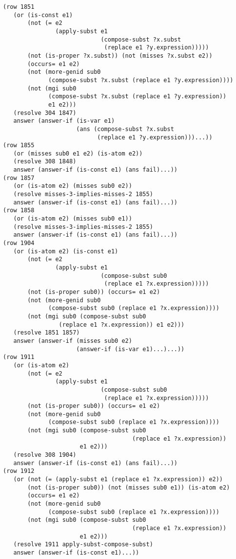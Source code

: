 \documentclass[runningheads]{llncs}
\begin{document}
\begin{verbatim}
(row 1851
   (or (is-const e1)
       (not (= e2
               (apply-subst e1
                            (compose-subst ?x.subst
                             (replace e1 ?y.expression)))))
       (not (is-proper ?x.subst)) (not (misses ?x.subst e2))
       (occurs= e1 e2)
       (not (more-genid sub0
             (compose-subst ?x.subst (replace e1 ?y.expression))))
       (not (mgi sub0
             (compose-subst ?x.subst (replace e1 ?y.expression)) 
             e1 e2)))
   (resolve 304 1847)
   answer (answer-if (is-var e1)
                     (ans (compose-subst ?x.subst
                           (replace e1 ?y.expression)))...))
(row 1855
   (or (misses sub0 e1 e2) (is-atom e2))
   (resolve 308 1848)
   answer (answer-if (is-const e1) (ans fail)...))
(row 1857
   (or (is-atom e2) (misses sub0 e2))
   (resolve misses-3-implies-misses-2 1855)
   answer (answer-if (is-const e1) (ans fail)...))
(row 1858
   (or (is-atom e2) (misses sub0 e1))
   (resolve misses-3-implies-misses-2 1855)
   answer (answer-if (is-const e1) (ans fail)...))
(row 1904
   (or (is-atom e2) (is-const e1)
       (not (= e2
               (apply-subst e1
                            (compose-subst sub0
                             (replace e1 ?x.expression)))))
       (not (is-proper sub0)) (occurs= e1 e2)
       (not (more-genid sub0
             (compose-subst sub0 (replace e1 ?x.expression))))
       (not (mgi sub0 (compose-subst sub0 
                (replace e1 ?x.expression)) e1 e2)))
   (resolve 1851 1857)
   answer (answer-if (misses sub0 e2)
                     (answer-if (is-var e1)...)...))
(row 1911
   (or (is-atom e2)
       (not (= e2
               (apply-subst e1
                            (compose-subst sub0
                             (replace e1 ?x.expression)))))
       (not (is-proper sub0)) (occurs= e1 e2)
       (not (more-genid sub0
             (compose-subst sub0 (replace e1 ?x.expression))))
       (not (mgi sub0 (compose-subst sub0 
                                     (replace e1 ?x.expression)) 
                      e1 e2)))
   (resolve 308 1904)
   answer (answer-if (is-const e1) (ans fail)...))
(row 1912
   (or (not (= (apply-subst e1 (replace e1 ?x.expression)) e2))
       (not (is-proper sub0)) (not (misses sub0 e1)) (is-atom e2)
       (occurs= e1 e2)
       (not (more-genid sub0
             (compose-subst sub0 (replace e1 ?x.expression))))
       (not (mgi sub0 (compose-subst sub0 
                                     (replace e1 ?x.expression))
                      e1 e2)))
   (resolve 1911 apply-subst-compose-subst)
   answer (answer-if (is-const e1)...))

\end{verbatim}
\end{document}
